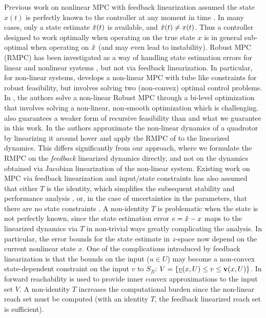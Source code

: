 Previous work on nonlinear MPC with feedback linearization assumed the state $x(t)$ is perfectly known to the controller at any moment in time \cite{SimonLG13_MPC}.
In many cases, only a state estimate $\hat{x}(t)$ is available, and $\hat{x}(t) \neq x(t)$.
Thus a controller designed to work optimally when operating on the true state $x$ is in general sub-optimal when operating on $\hat{x}$ (and may even lead to instability).
Robust MPC (RMPC) has been investigated as a way of handling state estimation errors for linear \cite{RichardsH05_RMPC} and nonlinear systems \cite{tube,relaxed}, but not via feedback linearization. 
In particular, for non-linear systems, \cite{tube} develops a non-linear MPC with tube like constraints for robust feasibility, but involves solving two (non-convex) optimal control problems. 
In \cite{relaxed}, the authors solve a non-linear Robust MPC through a bi-level optimization that involves solving a non-linear, non-smooth optimization which is challenging. 
\cite{relaxed} also guarantees a weaker form of recursive feasibility than \cite{RichardsH05_RMPC} and what we guarantee in this work. 
In \cite{Zhao20141335} the authors approximate the non-linear dynamics of a quadrotor by linearizing it around hover and apply the RMPC of \cite{RichardsH05_RMPC} to the linearized dynamics.
This differs significantly from our approach, where we formulate the RMPC on the \emph{feedback} linearized dynamics directly, and not on the dynamics obtained via Jacobian linearization of the non-linear system.
Existing work on MPC via feedback linearization and input/state constraints has also assumed that either $T$ is the identity, which simplifies the subsequent stability and performance analysis \cite{SimonLG13_MPC}, 
or, in the case of uncertainties in the parameters, that there are no state constraints \cite{parameter}.
A non-identity $T$ is problematic when the state is not perfectly known, since the state estimation error $e = \hat{x}-x$ maps to the linearized dynamics via $T$ in non-trivial ways greatly complicating the analysis.
In particular, the error bounds for the state estimate in $z$-space now depend on the current nonlinear state $x$.
One of the complications introduced by feedback linearization is that the bounds on the input ($u \in U$) may become a non-convex state-dependent constraint on the input $v$ to $S_{fl}$: 
$V = \{\underline{v}(x, U) \leq v \leq \mathbf{v}(x,U)\}$.
In \cite{SimonLG13_MPC} forward reachability is used to provide inner convex approximations to the input set $V$.
A non-identity $T$ increases the computational burden since the non-linear reach set must be computed (with an identity $T$, the feedback linearized reach set is sufficient).

